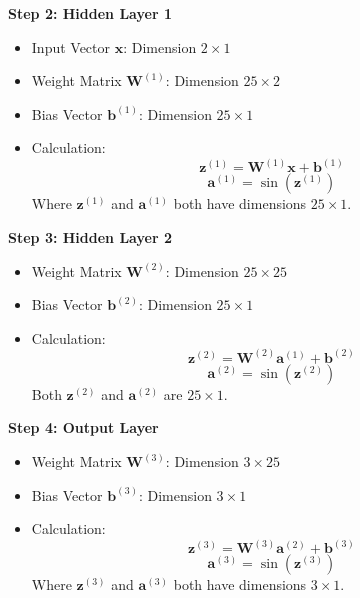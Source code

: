 \documentclass{ioereport}
\begin{document}
\textbf{Step 2: Hidden Layer 1}
\begin{itemize}
  \item Input Vector $\mathbf{x}$: Dimension $2 \times 1$
  \item Weight Matrix $\mathbf{W}^{(1)}$: Dimension $25 \times 2$
  \item Bias Vector $\mathbf{b}^{(1)}$: Dimension $25 \times 1$
  \item Calculation:
  \begin{equation}
  \mathbf{z}^{(1)} = \mathbf{W}^{(1)} \mathbf{x} + \mathbf{b}^{(1)}
  \end{equation}
  \begin{equation}
  \mathbf{a}^{(1)} = \sin(\mathbf{z}^{(1)})
  \end{equation}
  Where $\mathbf{z}^{(1)}$ and $\mathbf{a}^{(1)}$ both have dimensions $25 \times 1$.
\end{itemize}

\textbf{Step 3: Hidden Layer 2}
\begin{itemize}
  \item Weight Matrix $\mathbf{W}^{(2)}$: Dimension $25 \times 25$
  \item Bias Vector $\mathbf{b}^{(2)}$: Dimension $25 \times 1$
  \item Calculation:
  \begin{equation}
  \mathbf{z}^{(2)} = \mathbf{W}^{(2)} \mathbf{a}^{(1)} + \mathbf{b}^{(2)}
  \end{equation}
  \begin{equation}
  \mathbf{a}^{(2)} = \sin(\mathbf{z}^{(2)})
  \end{equation}
  Both $\mathbf{z}^{(2)}$ and $\mathbf{a}^{(2)}$ are $25 \times 1$.
\end{itemize}

\textbf{Step 4: Output Layer}
\begin{itemize}
  \item Weight Matrix $\mathbf{W}^{(3)}$: Dimension $3 \times 25$
  \item Bias Vector $\mathbf{b}^{(3)}$: Dimension $3 \times 1$
  \item Calculation:
  \begin{equation}
  \mathbf{z}^{(3)} = \mathbf{W}^{(3)} \mathbf{a}^{(2)} + \mathbf{b}^{(3)}
  \end{equation}
  \begin{equation}
  \mathbf{a}^{(3)} = \sin(\mathbf{z}^{(3)})
  \end{equation}
  Where $\mathbf{z}^{(3)}$ and $\mathbf{a}^{(3)}$ both have dimensions $3 \times 1$.
\end{itemize}
\end{document}
